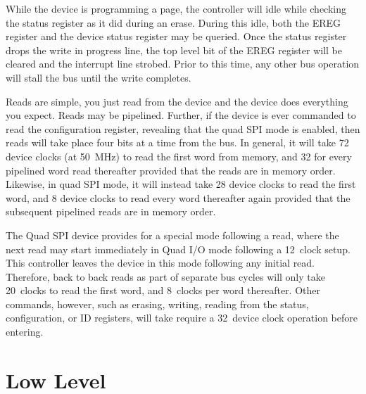 \documentclass{gqtekspec}
\begin{document}
While the device is programming a page, the controller will idle while
checking the status register as it did during an erase.  During this idle,
both the EREG register and the device status register may be queried.  Once
the status register drops the write in progress line, the top level bit of
the EREG register will be cleared and the interrupt line strobed.  Prior to this
time, any other bus operation will stall the bus until the write completes.

Reads are simple, you just read from the device and the device does everything
you expect.  Reads may be pipelined.  Further, if the device is ever commanded
to read the configuration register, revealing that the quad SPI mode is
enabled, then reads will take place four bits at a time from the bus.
In general, it will take 72 device clocks (at 50~MHz) to read the first word
from memory, and 32 for every pipelined word read thereafter provided that
the reads are in memory order.  Likewise, in quad SPI mode, it will
instead take 28 device clocks to read the first word, and 8 device clocks
to read every word thereafter again provided that the subsequent pipelined
reads are in memory order. 

The Quad SPI device provides for a special mode following a read, where the
next read may start immediately in Quad I/O mode following a 12~clock
setup.  This controller leaves the device in this mode following any initial
read.  Therefore, back to back reads as part of separate bus cycles will only
take 20~clocks to read the first word, and 8~clocks per word thereafter.
Other commands, however, such as erasing, writing, reading from the status,
configuration, or ID registers, will take require a 32~device clock operation
before entering.

\section{Low Level}
\end{document}
